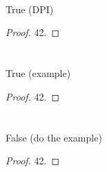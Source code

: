 \documentclass[
  coursecode={MTHE 474},
  assignmentname={Homework \homeworknumber},
  studentnumber=20053722,
  name={Bryan Hoang},
  draft,
]{
  ltxanswer%
}
\begin{document}
  \begin{questions}
    \setcounter{question}{\questionnumber}
    \addtocounter{question}{-1}
    \question[15]\
    \begin{parts}
      \part{}
      \begin{solution}
        \begin{claim}
          True (DPI)
        \end{claim}
        \begin{proof}
          42.
        \end{proof}
      \end{solution}

      \part{}
      \begin{solution}
        \begin{claim}
          True (example)
        \end{claim}
        \begin{proof}
          42.
        \end{proof}
      \end{solution}

      \part{}
      \begin{solution}
        \begin{claim}
          False (do the example)
        \end{claim}
        \begin{proof}
          42.
        \end{proof}
      \end{solution}
    \end{parts}
  \end{questions}
\end{document}

